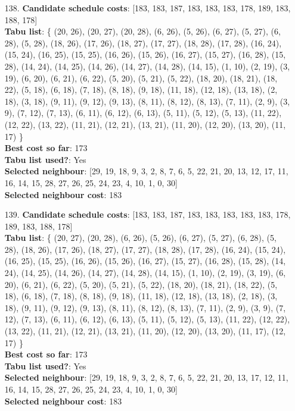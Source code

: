 \documentclass[fleqn]{article}
\begin{document}
\begin{itemize}
    \item[138.] \textbf{Candidate schedule costs}: [183, 183, 187, 183, 183, 183, 178, 189, 183, 188, 178] \\
    \textbf{Tabu list}: \{ (20, 26), (20, 27), (20, 28), (6, 26), (5, 26), (6, 27), (5, 27), (6, 28), (5, 28), (18, 26), (17, 26), (18, 27), (17, 27), (18, 28), (17, 28), (16, 24), (15, 24), (16, 25), (15, 25), (16, 26), (15, 26), (16, 27), (15, 27), (16, 28), (15, 28), (14, 24), (14, 25), (14, 26), (14, 27), (14, 28), (14, 15), (1, 10), (2, 19), (3, 19), (6, 20), (6, 21), (6, 22), (5, 20), (5, 21), (5, 22), (18, 20), (18, 21), (18, 22), (5, 18), (6, 18), (7, 18), (8, 18), (9, 18), (11, 18), (12, 18), (13, 18), (2, 18), (3, 18), (9, 11), (9, 12), (9, 13), (8, 11), (8, 12), (8, 13), (7, 11), (2, 9), (3, 9), (7, 12), (7, 13), (6, 11), (6, 12), (6, 13), (5, 11), (5, 12), (5, 13), (11, 22), (12, 22), (13, 22), (11, 21), (12, 21), (13, 21), (11, 20), (12, 20), (13, 20), (11, 17) \} \\
    \textbf{Best cost so far}: 173 \\
    \textbf{Tabu list used?}: Yes \\
    \textbf{Selected neighbour}: [29, 19, 18, 9, 3, 2, 8, 7, 6, 5, 22, 21, 20, 13, 12, 17, 11, 16, 14, 15, 28, 27, 26, 25, 24, 23, 4, 10, 1, 0, 30] \\
    \textbf{Selected neighbour cost}: 183
      

    \item[139.] \textbf{Candidate schedule costs}: [183, 183, 187, 183, 183, 183, 183, 183, 178, 189, 183, 188, 178] \\
    \textbf{Tabu list}: \{ (20, 27), (20, 28), (6, 26), (5, 26), (6, 27), (5, 27), (6, 28), (5, 28), (18, 26), (17, 26), (18, 27), (17, 27), (18, 28), (17, 28), (16, 24), (15, 24), (16, 25), (15, 25), (16, 26), (15, 26), (16, 27), (15, 27), (16, 28), (15, 28), (14, 24), (14, 25), (14, 26), (14, 27), (14, 28), (14, 15), (1, 10), (2, 19), (3, 19), (6, 20), (6, 21), (6, 22), (5, 20), (5, 21), (5, 22), (18, 20), (18, 21), (18, 22), (5, 18), (6, 18), (7, 18), (8, 18), (9, 18), (11, 18), (12, 18), (13, 18), (2, 18), (3, 18), (9, 11), (9, 12), (9, 13), (8, 11), (8, 12), (8, 13), (7, 11), (2, 9), (3, 9), (7, 12), (7, 13), (6, 11), (6, 12), (6, 13), (5, 11), (5, 12), (5, 13), (11, 22), (12, 22), (13, 22), (11, 21), (12, 21), (13, 21), (11, 20), (12, 20), (13, 20), (11, 17), (12, 17) \} \\
    \textbf{Best cost so far}: 173 \\
    \textbf{Tabu list used?}: Yes \\
    \textbf{Selected neighbour}: [29, 19, 18, 9, 3, 2, 8, 7, 6, 5, 22, 21, 20, 13, 17, 12, 11, 16, 14, 15, 28, 27, 26, 25, 24, 23, 4, 10, 1, 0, 30] \\
    \textbf{Selected neighbour cost}: 183
      


\end{itemize}
\end{document}
